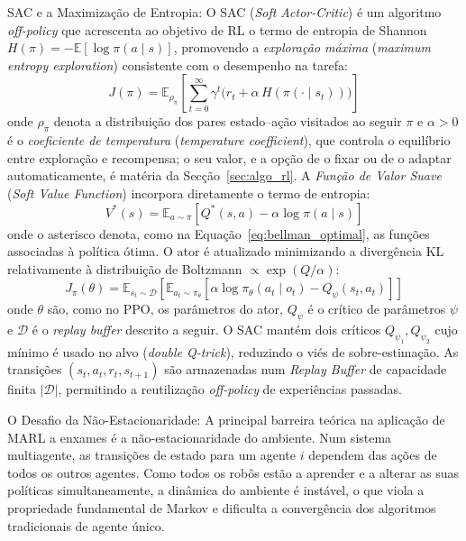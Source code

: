 \documentclass[12pt,reqno, twoside]{amsbook}
\makeatletter
\def\paragraph{\@startsection{paragraph}{4}%
  \z@\z@{-\fontdimen2\font}%
  {\normalfont\bfseries}}
\theoremstyle{plain}
\numberwithin{equation}{chapter}
\numberwithin{section}{chapter}
\numberwithin{table}{chapter}
\numberwithin{figure}{chapter}
\makeatother
\begin{document}
\paragraph{SAC e a Maximização de Entropia:}
O SAC (\textit{Soft Actor-Critic}) \cite{haarnoja2018sac} é um algoritmo \textit{off-policy} que acrescenta ao objetivo de RL o termo de entropia de Shannon $H(\pi) = -\mathbb{E}[\log \pi(a\mid s)]$, promovendo a \emph{exploração máxima} (\textit{maximum entropy exploration}) consistente com o desempenho na tarefa:
\begin{equation}
    J(\pi) = \mathbb{E}_{\rho_\pi}\!\left[\sum_{t=0}^{\infty} \gamma^t \Big(r_t + \alpha\, H(\pi(\cdot\mid s_t))\Big)\right]
    \label{eq:sac_objective}
\end{equation}
onde $\rho_\pi$ denota a distribuição dos pares estado--ação visitados ao seguir $\pi$ e $\alpha > 0$ é o \emph{coeficiente de temperatura} (\textit{temperature coefficient}), que controla o equilíbrio entre exploração e recompensa; o seu valor, e a opção de o fixar ou de o adaptar automaticamente, é matéria da Secção~\ref{sec:algo_rl}. A \emph{Função de Valor Suave} (\textit{Soft Value Function}) incorpora diretamente o termo de entropia:
\begin{equation}
    V^*(s) = \mathbb{E}_{a\sim\pi}\!\left[Q^*(s,a) - \alpha\log\pi(a\mid s)\right]
    \label{eq:sac_v}
\end{equation}
onde o asterisco denota, como na Equação~\ref{eq:bellman_optimal}, as funções associadas à política ótima.
O ator é atualizado minimizando a divergência KL relativamente à distribuição de Boltzmann $\propto \exp(Q/\alpha)$:
\begin{equation}
    J_\pi(\theta) = \mathbb{E}_{s_t\sim\mathcal{D}}\!\left[\mathbb{E}_{a_t\sim\pi_\theta}\!\left[\alpha\log\pi_\theta(a_t\mid o_t) - Q_\psi(s_t, a_t)\right]\right]
    \label{eq:sac_actor}
\end{equation}
onde $\theta$ são, como no PPO, os parâmetros do ator, $Q_\psi$ é o crítico de parâmetros $\psi$ e $\mathcal{D}$ é o \textit{replay buffer} descrito a seguir.
O SAC mantém dois críticos $Q_{\psi_1}, Q_{\psi_2}$ cujo mínimo é usado no alvo (\textit{double Q-trick}), reduzindo o viés de sobre-estimação. As transições $(s_t, a_t, r_t, s_{t+1})$ são armazenadas num \emph{Replay Buffer} de capacidade finita $|\mathcal{D}|$, permitindo a reutilização \textit{off-policy} de experiências passadas.

\paragraph{O Desafio da Não-Estacionaridade:} A principal barreira teórica na aplicação de MARL a enxames é a não-estacionaridade do ambiente. Num sistema multiagente, as transições de estado para um agente $i$ dependem das ações de todos os outros agentes. Como todos os robôs estão a aprender e a alterar as suas políticas simultaneamente, a dinâmica do ambiente é instável, o que viola a propriedade fundamental de Markov e dificulta a convergência dos algoritmos tradicionais de agente único.
\end{document}
